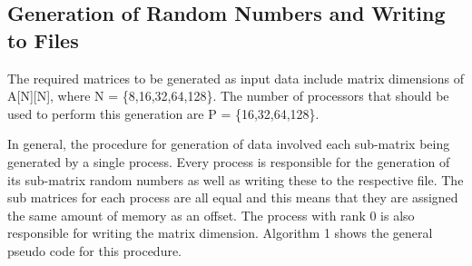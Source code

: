 \documentclass[11pt,conference]{IEEEtran}
\begin{document}
\subsection{Generation of Random Numbers and Writing to Files}
\noindent
The required matrices to be generated as input data include matrix dimensions of A[N][N], where N = \{8,16,32,64,128\}. The number of processors that should be used to perform this generation are P = \{16,32,64,128\}. 


\noindent
In general, the procedure for generation of data involved each sub-matrix being generated by a single process. Every process is responsible for the generation of its sub-matrix random numbers as well as writing these to the respective file. The sub matrices for each process are all equal and this means that they are assigned the same amount of memory as an offset. The process with rank 0 is also responsible for writing the matrix dimension. Algorithm 1 shows the general pseudo code for this procedure.
\end{document}
